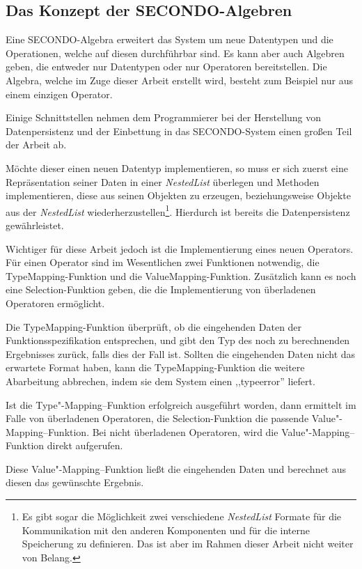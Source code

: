 \subsection{Das Konzept der SECONDO-Algebren}

Eine SECONDO-Algebra erweitert das System um neue Datentypen und die Operationen, welche auf diesen durchführbar sind. Es kann aber auch Algebren geben, die entweder nur Datentypen oder nur Operatoren bereitstellen. Die Algebra, welche im Zuge dieser Arbeit erstellt wird, besteht zum Beispiel nur aus einem einzigen Operator.

Einige Schnittstellen nehmen dem Programmierer bei der Herstellung von Datenpersistenz und der Einbettung in das SECONDO-System  einen großen Teil der Arbeit ab.

Möchte dieser einen neuen Datentyp implementieren, so muss er sich zuerst eine Repräsentation seiner Daten in einer \textit{NestedList} überlegen und Methoden implementieren, diese aus seinen Objekten zu erzeugen, beziehungsweise Objekte aus der \textit{NestedList} wiederherzustellen\footnote{Es gibt sogar die Möglichkeit zwei verschiedene \textit{NestedList} Formate für die Kommunikation mit den anderen Komponenten und für die interne Speicherung zu definieren. Das ist aber im Rahmen dieser Arbeit nicht weiter von Belang.}. Hierdurch ist bereits die Datenpersistenz gewährleistet.

Wichtiger für diese Arbeit jedoch ist die Implementierung eines neuen Operators. Für einen Operator sind im Wesentlichen zwei Funktionen notwendig, die TypeMapping-Funktion und die ValueMapping-Funktion. Zusätzlich kann es noch eine Selection-Funktion geben, die die Implementierung von überladenen Operatoren ermöglicht.

Die TypeMapping-Funktion überprüft, ob die eingehenden Daten der Funktionsspezifikation entsprechen, und gibt den Typ des noch zu berechnenden Ergebnisses zurück, falls dies der Fall ist. Sollten die eingehenden Daten nicht das erwartete Format haben, kann die TypeMapping-Funktion die weitere Abarbeitung abbrechen, indem sie dem System einen ,,typeerror'' liefert.

Ist die Type"-Mapping--Funktion erfolgreich ausgeführt worden, dann ermittelt im Falle von überladenen Operatoren, die Selection-Funktion die passende Value"-Mapping--Funktion. Bei nicht überladenen Operatoren, wird die Value"-Mapping--Funktion direkt aufgerufen.

 Diese Value"-Mapping--Funktion ließt die eingehenden Daten und berechnet aus diesen das gewünschte Ergebnis.


